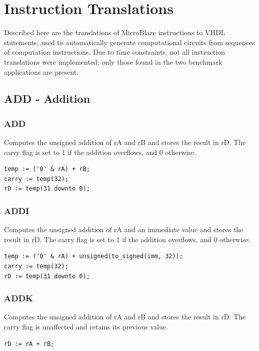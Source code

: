 \documentclass{UoYCSproject}
\begin{document}
\chapter{Instruction Translations}
\label{appendix:translations}

Described here are the translations of MicroBlaze instructions to VHDL statements, used to automatically
generate computational circuits from sequences of computation instructions. Due to time constraints, not all
instruction translations were implemented; only those found in the two benchmark applications are present.

\section{ADD - Addition}

\subsection{ADD}

Computes the unsigned addition of rA and rB and stores the result in rD. The carry flag is set to 1 if the addition
overflows, and 0 otherwise.

\begin{lstlisting}
temp := ('0' & rA) + rB;
carry := temp(32);
rD := temp(31 downto 0);
\end{lstlisting}

\subsection{ADDI}

Computes the unsigned addition of rA and an immediate value and stores the result in rD. The carry flag is set to 1 if the
addition overflows, and 0 otherwise.

\begin{lstlisting}
temp := ('0' & rA) + unsigned(to_signed(imm, 32));
carry := temp(32);
rD := temp(31 downto 0);
\end{lstlisting}

\subsection{ADDK}

Computes the unsigned addition of rA and rB and stores the result in rD. The carry flag is unaffected and retains its previous
value.

\begin{lstlisting}
rD := rA + rB;
\end{lstlisting}
\end{document}

